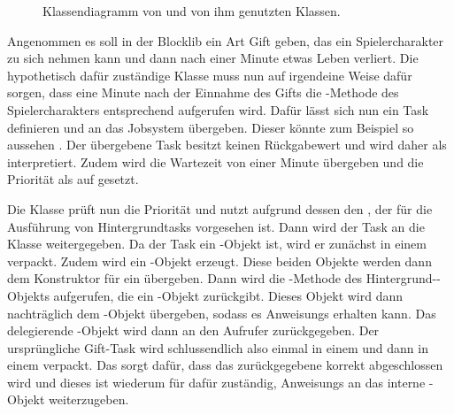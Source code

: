 \begin{figure}
	\centering
	
	\caption{Klassendiagramm von  und von ihm genutzten Klassen.}\label{fig:wrapper}
\end{figure}

\begin{leftrule}
	Angenommen es soll in der Blocklib ein Art Gift geben, das ein Spielercharakter zu sich nehmen kann und dann nach einer Minute etwas Leben verliert. Die hypothetisch dafür zuständige Klasse muss nun auf irgendeine Weise dafür sorgen, dass eine Minute nach der Einnahme des Gifts die -Methode des Spielercharakters entsprechend aufgerufen wird. Dafür lässt sich nun ein Task definieren und an das Jobsystem übergeben. Dieser könnte zum Beispiel so aussehen . Der übergebene Task besitzt keinen Rückgabewert und wird daher als  interpretiert. Zudem wird die Wartezeit von einer Minute übergeben und die Priorität als auf  gesetzt.

	Die Klasse  prüft nun die Priorität und nutzt aufgrund dessen den , der für die Ausführung von Hintergrundtasks vorgesehen ist. Dann wird der Task an die Klasse  weitergegeben. Da der Task ein -Objekt ist, wird er zunächst in einem  verpackt. Zudem wird ein -Objekt erzeugt. Diese beiden Objekte werden dann dem Konstruktor für ein  übergeben. Dann wird die -Methode des Hintergrund--Objekts aufgerufen, die ein -Objekt zurückgibt. Dieses Objekt wird dann nachträglich dem -Objekt übergeben, sodass es \glspl{Anweisung} erhalten kann. Das delegierende -Objekt wird dann an den Aufrufer zurückgegeben. Der ursprüngliche Gift-Task wird schlussendlich also einmal in einem  und dann in einem  verpackt. Das  sorgt dafür, dass das zurückgegebene  korrekt abgeschlossen wird und dieses ist wiederum für dafür zuständig, \glspl{Anweisung} an das interne -Objekt weiterzugeben.
\end{leftrule}

